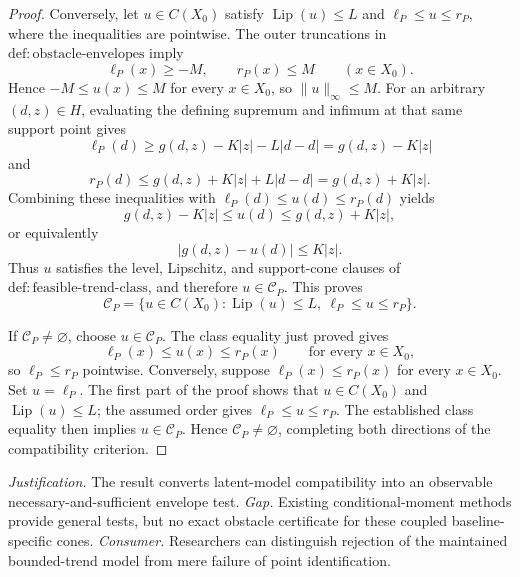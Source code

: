 \documentclass{article}
\begin{document}
\begin{proof}
Conversely, let \(u\in C(X_0)\) satisfy \(\operatorname{Lip}(u)\le L\) and \(\ell_P\le u\le r_P\), where the inequalities are pointwise.  The outer truncations in \(\mathrm{def:obstacle\mbox{-}envelopes}\) imply
\[
\ell_P(x)\ge -M,
\qquad
r_P(x)\le M
\qquad (x\in X_0).
\]
Hence \(-M\le u(x)\le M\) for every \(x\in X_0\), so \(\|u\|_\infty\le M\).  For an arbitrary \((d,z)\in H\), evaluating the defining supremum and infimum at that same support point gives
\[
\ell_P(d)
\ge g(d,z)-K|z|-L|d-d|
=g(d,z)-K|z|
\]
and
\[
r_P(d)
\le g(d,z)+K|z|+L|d-d|
=g(d,z)+K|z|.
\]
Combining these inequalities with \(\ell_P(d)\le u(d)\le r_P(d)\) yields
\[
g(d,z)-K|z|\le u(d)\le g(d,z)+K|z|,
\]
or equivalently
\[
|g(d,z)-u(d)|\le K|z|.
\]
Thus \(u\) satisfies the level, Lipschitz, and support-cone clauses of \(\mathrm{def:feasible\mbox{-}trend\mbox{-}class}\), and therefore \(u\in\mathcal C_P\).  This proves
\[
\mathcal C_P
=
\{u\in C(X_0):\operatorname{Lip}(u)\le L,\ \ell_P\le u\le r_P\}.
\]

If \(\mathcal C_P\ne\varnothing\), choose \(u\in\mathcal C_P\).  The class equality just proved gives
\[
\ell_P(x)\le u(x)\le r_P(x)
\qquad\text{for every }x\in X_0,
\]
so \(\ell_P\le r_P\) pointwise.  Conversely, suppose \(\ell_P(x)\le r_P(x)\) for every \(x\in X_0\).  Set \(u=\ell_P\).  The first part of the proof shows that \(u\in C(X_0)\) and \(\operatorname{Lip}(u)\le L\); the assumed order gives \(\ell_P\le u\le r_P\).  The established class equality then implies \(u\in\mathcal C_P\).  Hence \(\mathcal C_P\ne\varnothing\), completing both directions of the compatibility criterion.
\end{proof}
\par\smallskip\noindent \textit{Justification.} The result converts latent-model compatibility into an observable necessary-and-sufficient envelope test. \textit{Gap.} Existing conditional-moment methods provide general tests, but no exact obstacle certificate for these coupled baseline-specific cones. \textit{Consumer.} Researchers can distinguish rejection of the maintained bounded-trend model from mere failure of point identification.
\end{document}
